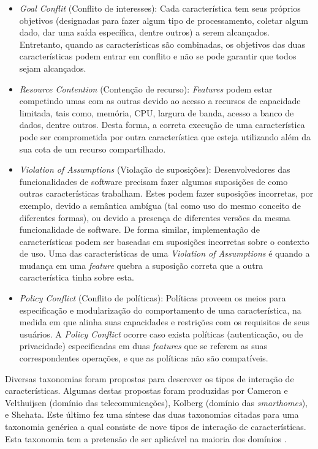 \begin{itemize}
\item \textit{Goal Conflit} (Conflito de interesses): Cada característica tem seus próprios objetivos (designadas para fazer algum tipo de processamento, coletar algum dado, dar uma saída específica, dentre outros) a serem alcançados. Entretanto, quando as características são combinadas, os objetivos das duas características podem entrar em conflito e não se pode garantir que todos sejam alcançados. 
\item \textit{Resource Contention} (Contenção de recurso): \textit{Features} podem estar competindo umas com as outras devido ao acesso a recursos de capacidade limitada, tais como, memória, CPU, largura de banda, acesso a banco de dados, dentre outros. Desta forma, a correta execução de uma característica pode ser comprometida por outra característica que esteja utilizando além da sua cota de um recurso compartilhado.
\item \textit{Violation of Assumptions} (Violação de suposições): Desenvolvedores das funcionalidades de software precisam fazer algumas suposições de como outras características trabalham. Estes podem fazer suposições incorretas, por exemplo, devido a semântica ambígua (tal como uso do mesmo conceito de diferentes formas), ou devido a presença de diferentes versões da mesma funcionalidade de software. De forma similar, implementação de características podem ser baseadas em suposições incorretas sobre o contexto de uso. Uma das características de uma \textit{Violation of Assumptions} é quando a mudança em uma \textit{feature} quebra a suposição correta que a outra característica tinha sobre esta.
\item \textit{Policy Conflict} (Conflito de políticas): Políticas proveem os meios para especificação e modularização do comportamento de uma característica, na medida em que alinha suas capacidades e restrições com os requisitos de seus usuários. A \textit{Policy Conflict} ocorre caso exista políticas (autenticação, ou de privacidade) especificadas em duas \textit{features} que se referem as suas correspondentes operações, e que as políticas não são compatíveis.
\end{itemize}

Diversas taxonomias foram propostas para descrever os tipos de interação de características. Algumas destas propostas foram produzidas por Cameron e Velthuijsen (domínio das telecomunicações), Kolberg (domínio das \textit{smarthomes}), e Shehata. Este último fez uma síntese das duas taxonomias citadas para uma taxonomia genérica a qual consiste de nove tipos de interação de características. Esta taxonomia tem a pretensão de ser aplicável na maioria dos domínios \cite{NHLABATSI:2008}.

